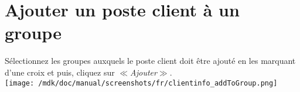 \section{Ajouter un poste client \`a un groupe}S\'electionnez les groupes auxquels le poste client doit \^etre ajout\'e en les marquant d'une croix et puis, cliquez sur \textit{$\ll$Ajouter$\gg$}.\\
\texttt{[image: /mdk/doc/manual/screenshots/fr/clientinfo\_addToGroup.png]} \\
